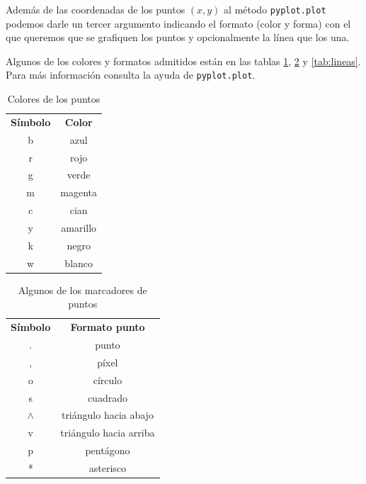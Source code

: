 \begin{paracol}{2}
    Además de las coordenadas de los puntos $(x,y)$ al método \texttt{pyplot.plot} podemos darle un tercer argumento indicando el formato (color y forma) con el que queremos que se grafiquen los puntos y opcionalmente la línea que los una. 

    Algunos de los colores y formatos admitidos están en las tablas \ref{tab:colores}, \ref{tab:puntos} y \ref{tab:lineas}. Para más información consulta la ayuda de \texttt{pyplot.plot}.

    
    \begin{table}
        \centering
        \begin{tabular}{|c|c|} \hline
        \textbf{Símbolo}     &  \textbf{Color}\\
             b& azul \\ \hline
             r& rojo \\ \hline
             g& verde \\ \hline
             m& magenta\\ \hline
             c& cian\\ \hline
             y& amarillo\\ \hline
             k& negro\\ \hline
             w& blanco\\ \hline
        \end{tabular}
        \caption{Colores de los puntos}
        \label{tab:colores}
    \end{table}

    
    \begin{table}
        \centering
        \begin{tabular}{|c|c|} \hline
        \textbf{Símbolo}     &  \textbf{Formato punto}\\
             .& punto \\ \hline
             ,& píxel\\ \hline
             o& círculo \\ \hline
             s& cuadrado\\ \hline
             $\wedge$ & triángulo hacia abajo\\ \hline
             v& triángulo hacia arriba\\ \hline
             p& pentágono\\ \hline
             *& asterisco\\ \hline
        \end{tabular}
        \caption{Algunos de los marcadores de puntos}
        \label{tab:puntos}
    \end{table}


\end{paracol}
